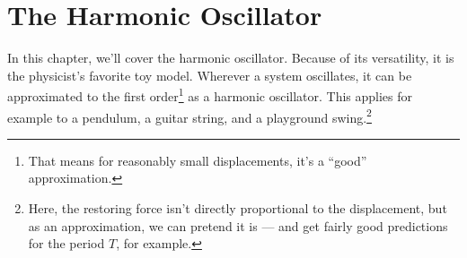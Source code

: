 \section{The Harmonic Oscillator}%
In this chapter, we'll cover the harmonic oscillator. Because of its versatility, it is the physicist's favorite toy model.  
Wherever a system oscillates, it can be approximated to the first order\footnote{That means for reasonably small displacements, it's a ``good'' approximation.} as a harmonic oscillator. This applies for example to a pendulum, a guitar string, and a playground swing.\footnote{Here, the restoring force isn't directly proportional to the displacement, but as an approximation, we can pretend it is --- and get fairly good predictions for the period $T$, for example.}



